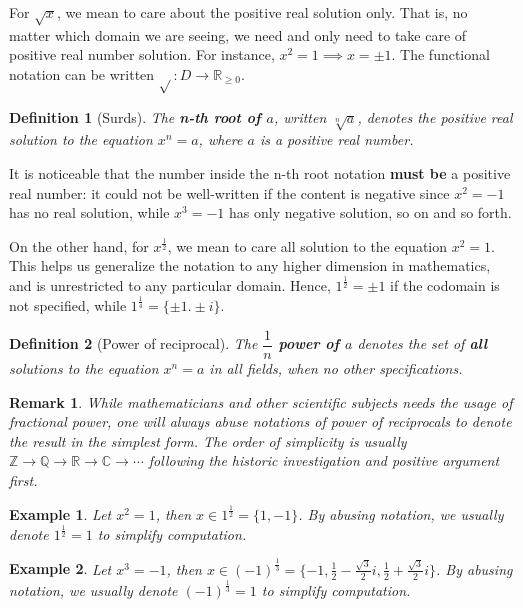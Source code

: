 \documentclass[12pt]{article}
\newtheorem{definition}{Definition}[section]
\newtheorem*{remark}{Remark}
\newtheorem*{example}{Example}
\begin{document}
    For $\sqrt{x}$, we mean to care about the positive real solution only. That is, no matter which domain we are seeing, we need and only need to take care of positive real number solution. For instance, $x^2=1\implies x=\pm 1$. The functional notation can be written $\sqrt{}:D\to\mathbb{R}_{\geq 0}$.

    \begin{definition}[Surds]
        The \textbf{n-th root of $a$}, written $\sqrt[n]{a}$, denotes the positive real solution to the equation $x^n=a$, where $a$ is a positive real number.
    \end{definition}

    It is noticeable that the number inside the n-th root notation \textbf{must be} a positive real number: it could not be well-written if the content is negative since $x^2=-1$ has no real solution, while $x^3=-1$ has only negative solution, so on and so forth.

    On the other hand, for $x^{\frac{1}{2}}$, we mean to care all solution to the equation $x^2=1$. This helps us generalize the notation to any higher dimension in mathematics, and is unrestricted to any particular domain. Hence, $1^{\frac{1}{2}}=\pm 1$ if the codomain is not specified, while $1^{\frac{1}{4}}=\{\pm 1. \pm i\}$.

    \begin{definition}[Power of reciprocal]
        The \textbf{$\dfrac{1}{n}$ power of $a$} denotes the set of \textbf{all} solutions to the equation $x^n=a$ in all fields, when no other specifications.
    \end{definition}

    \begin{remark}
        While mathematicians and other scientific subjects needs the usage of fractional power, one will always abuse notations of power of reciprocals to denote the result in the simplest form. The order of simplicity is usually $\mathbb{Z} \to \mathbb{Q} \to \mathbb{R} \to \mathbb{C} \to \cdots$ following the historic investigation and positive argument first.
    \end{remark}

    \begin{example}
        Let $x^2=1$, then $x\in 1^{\frac{1}{2}}=\{1,-1\}$. By abusing notation, we usually denote $1^{\frac{1}{2}}=1$ to simplify computation.
    \end{example}

    \begin{example}
        Let $x^3=-1$, then $x\in (-1)^{\frac{1}{3}}=\{-1,\frac{1}{2}-\frac{\sqrt{3}}{2}i,\frac{1}{2}+\frac{\sqrt{3}}{2}i\}$. By abusing notation, we usually denote $(-1)^{\frac{1}{3}}=1$ to simplify computation.
    \end{example}
\end{document}
